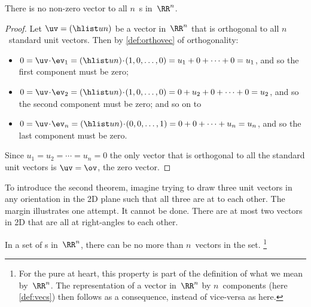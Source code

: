 \begin{theorem} \label{thm:nononz}
There is no non-zero vector  to all \(n\)~s in~\(\RR^n\).
\end{theorem}

\begin{proof} 
Let \(\uv=(\hlist un)\) be a vector in~\(\RR^n\) that is orthogonal to all \(n\)~standard unit vectors.  
Then by \autoref{def:orthovec} of orthogonality:
\begin{itemize}
\item \(0=\uv\cdot\ev_1=(\hlist un)\cdot(1,0,\ldots,0)=u_1+0+\cdots+0=u_1\), and so the first component must be zero;
\item \(0=\uv\cdot\ev_2=(\hlist un)\cdot(1,0,\ldots,0)=0+u_2+0+\cdots+0=u_2\), and so the second component must be zero; and so on to
\item \(0=\uv\cdot\ev_n=(\hlist un)\cdot(0,0,\ldots,1)=0+0+\cdots+u_n=u_n\), and so the last component must be zero.
\end{itemize}
Since \(u_1=u_2=\cdots=u_n=0\) the only vector that is orthogonal to all the standard unit vectors is \(\uv=\ov\), the zero vector.
\end{proof}


To introduce the second theorem, 
%
imagine trying to draw three unit vectors in any orientation in the 2D plane such that all three are at  to each other.
The margin illustrates one attempt.
It cannot be done.
There are at most two vectors in 2D that are all at right-angles to each other.


\begin{theorem} \label{thm:orthcomp}
In a set of  s in~\(\RR^n\), there can be no more than \(n\)~vectors in the set.
\footnote{For the pure at heart, this property is part of the definition of what we mean by~\(\RR^n\).  
The representation of a vector in~\(\RR^n\) by \(n\)~components (here \autoref{def:vecs}) then follows as a consequence, instead of vice-versa as here.}
\end{theorem}


